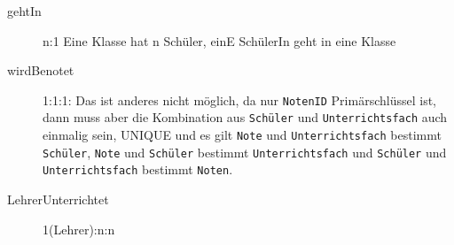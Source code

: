 \documentclass{bschlangaul-aufgabe}
\begin{document}
\begin{bAntwort}

\begin{description}
\item[gehtIn] n:1 Eine Klasse hat n Schüler, einE SchülerIn geht in eine
Klasse

\item[wirdBenotet]  1:1:1: Das ist anderes nicht möglich, da nur
\texttt{NotenID} Primärschlüssel ist, dann muss aber die Kombination aus
\texttt{Schüler} und \texttt{Unter\-richtsfach} auch einmalig sein, \dh
UNIQUE und es gilt \texttt{Note} und \texttt{Unter\-richtsfach} bestimmt
\texttt{Schüler}, \texttt{Note} und \texttt{Schüler} bestimmt
\texttt{Unterrichtsfach} und \texttt{Schüler} und
\texttt{Unterrichtsfach} bestimmt
\texttt{Noten}.

\item[LehrerUnterrichtet] 1(Lehrer):n:n
\end{description}
\end{bAntwort}
\end{document}
